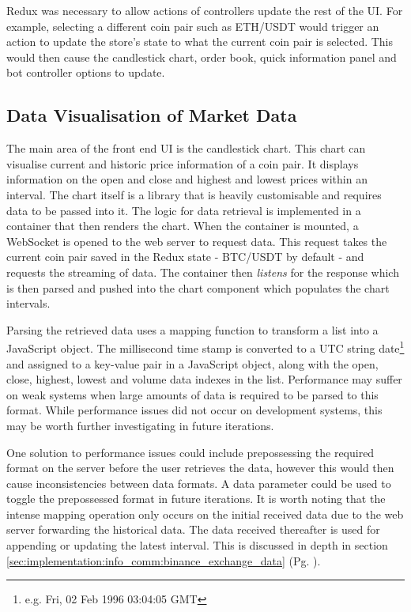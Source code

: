 Redux was necessary to allow actions of controllers update the rest of the UI. For example, selecting a different coin pair such as ETH/USDT would trigger an action to update the store's state to what the current coin pair is selected. This would then cause the candlestick chart, order book, quick information panel and bot controller options to update. 

\subsection{Data Visualisation of Market Data}
\label{sec:implementation:frontend:data_vis}
\noindent The main area of the front end UI is the candlestick chart. This chart can visualise current and historic price information of a coin pair. It displays information on the open and close and highest and lowest prices within an interval. The chart itself is a library that is heavily customisable and requires data to be passed into it. The logic for data retrieval is implemented in a container that then renders the chart. When the container is mounted, a WebSocket is opened to the web server to request data. This request takes the current coin pair saved in the Redux state - BTC/USDT by default - and requests the streaming of data. The container then \textit{listens} for the response which is then parsed and pushed into the chart component which populates the chart intervals.

Parsing the retrieved data uses a mapping function to transform a list into a JavaScript object. The millisecond time stamp is converted to a UTC string date\footnote{e.g. Fri, 02 Feb 1996 03:04:05 GMT} and assigned to a key-value pair in a JavaScript object, along with the open, close, highest, lowest and volume data indexes in the list. Performance may suffer on weak systems when large amounts of data is required to be parsed to this format. While performance issues did not occur on development systems, this may be worth further investigating in future iterations. 

One solution to performance issues could include prepossessing the required format on the server before the user retrieves the data, however this would then cause inconsistencies between data formats. A data parameter could be used to toggle the prepossessed format in future iterations. It is worth noting that the intense mapping operation only occurs on the initial received data due to the web server forwarding the historical data. The data received thereafter is used for appending or updating the latest interval. This is discussed in depth in section \ref{sec:implementation:info_comm:binance_exchange_data} (Pg. \pageref{sec:implementation:info_comm:binance_exchange_data}).

